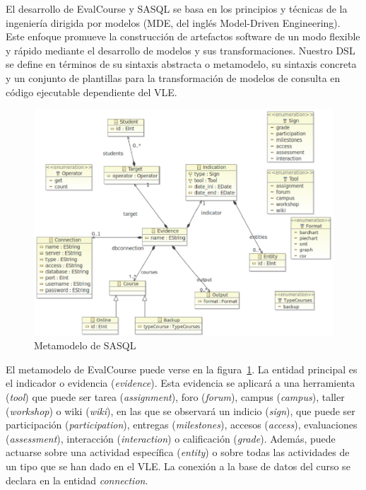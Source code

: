 El desarrollo de EvalCourse y SASQL se basa en los principios y técnicas de la ingeniería dirigida por modelos (MDE, del inglés Model-Driven Engineering). Este enfoque promueve la construcción de artefactos software de un modo flexible y rápido mediante el desarrollo de modelos y sus transformaciones. Nuestro DSL se define en términos de su sintaxis abstracta o metamodelo, su sintaxis concreta y un conjunto de plantillas para la transformación de modelos de consulta en código ejecutable dependiente del VLE.

\begin{figure}
  \begin{center}
    \includegraphics[scale=0.4]{EvcMetamodel.png}
  \end{center}
  \caption{Metamodelo de SASQL}
  \label{fig:EvcMetamodel}
\end{figure}

El metamodelo de EvalCourse puede verse en la figura~\ref{fig:EvcMetamodel}. La entidad principal es el indicador o evidencia (\emph{evidence}). Esta evidencia se aplicará a una herramienta (\emph{tool}) que puede ser tarea (\emph{assignment}), foro (\emph{forum}), campus (\emph{campus}), taller (\emph{workshop}) o wiki (\emph{wiki}), en las que se observará un indicio (\emph{sign}), que puede ser participación (\emph{participation}), entregas (\emph{milestones}), accesos (\emph{access}), evaluaciones (\emph{assessment}), interacción (\emph{interaction}) o calificación (\emph{grade}). Además, puede actuarse sobre una actividad específica (\emph{entity}) o sobre todas las actividades de un tipo que se han dado en el VLE. La conexión a la base de datos del curso se declara en la entidad \emph{connection}. 

